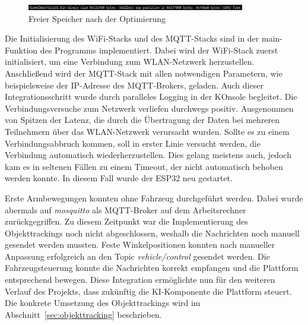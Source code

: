 \begin{figure}[H]
    \centering
    \includegraphics[width=0.85\textwidth]{images/memory_size_after.png}
    \caption{Freier Speicher nach der Optimierung}
    \label{fig:memory_size_after}
\end{figure}

Die Initialisierung des WiFi-Stacks und des MQTT-Stacks sind in der main-Funktion des Programms implementiert. Dabei wird der WiFi-Stack zuerst initialisiert, um eine Verbindung zum WLAN-Netzwerk herzustellen. Anschließend wird der MQTT-Stack mit allen notwendigen Parametern, wie beispielsweise der IP-Adresse des MQTT-Brokers, geladen. Auch dieser Integrationsschritt wurde durch paralleles Logging in der KOnsole begleitet. Die Verbindungsversuche zum Netzwerk verliefen durchwegs positiv. Ausgenommen von Spitzen der Latenz, die durch die Übertragung der Daten bei mehreren Teilnehmern über das WLAN-Netzwerk verursacht wurden. Sollte es zu einem Verbindungsabbruch kommen, soll in erster Linie versucht werden, die Verbindung automatisch wiederherzustellen. Dies gelang meistens auch, jedoch kam es in seltenen Fällen zu einem Timeout, der nicht automatisch behoben werden konnte. In diesem Fall wurde der ESP32 neu gestartet. \newline

Erste Armbewegungen konnten ohne Fahrzeug durchgeführt werden. Dabei wurde abermals auf \textit{mosquitto} als MQTT-Broker auf dem Arbeitsrechner zurückgegriffen. Zu diesem Zeitpunkt war die Implementierung des Objekttrackings noch nicht abgeschlossen, weshalb die Nachrichten noch manuell gesendet werden mussten. Feste Winkelpositionen konnten nach manueller Anpassung erfolgreich an den Topic \textit{vehicle/control} gesendet werden. Die Fahrzeugsteuerung konnte die Nachrichten korrekt empfangen und die Plattform entsprechend bewegen. Diese Integration ermöglichte nun für den weiteren Verlauf des Projekts, dass zukünftig die KI-Komponente die Plattform steuert. Die konkrete Umsetzung des Objekttrackings wird im Abschnitt~\ref{sec:objekttracking} beschrieben. \newline